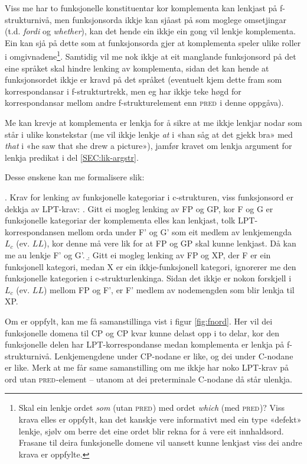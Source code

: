 \documentclass[12pt,a4paper,oneside,draft]{report}
\newcommand{\F}[2]{\textsc{#1}\ensuremath{_{#2}}}
\newcommand{\PRED}{\F{pred}{}}
\begin{document}
Viss me har to funksjonelle konstituentar kor komplementa kan lenkjast
 på f\hyp{}strukturnivå, men funksjonsorda ikkje kan sjåast på som
 moglege omsetjingar (t.d. \emph{fordi} og \emph{whether}), kan det hende ein
 ikkje ein gong vil lenkje komplementa. Ein kan sjå på dette som at
 funksjonsorda gjer at komplementa speler ulike roller i
 omgivnadene\footnote{Skal ein lenkje ordet \emph{som} (utan \PRED{}) med ordet \emph{which} (med
        \PRED{})? Viss krava elles er oppfylt, kan det kanskje vere
        informativt med ein type «defekt» lenkje, sjølv om berre det
        eine ordet blir rekna for å vere eit innhaldsord. Frasane til
        deira funksjonelle domene vil uansett kunne lenkjast viss dei andre
        krava er oppfylte. }. Samtidig vil me nok ikkje at eit manglande
 funksjonsord på det eine språket skal hindre lenking av komplementa,
 sidan det kan hende at funksjonsordet ikkje er kravd på det språket
 (eventuelt kjem dette fram som korrespondansar i
 f\hyp{}strukturtrekk, men eg har ikkje teke høgd for korrespondansar
 mellom andre f\hyp{}strukturelement enn \PRED{} i denne oppgåva).

Me kan krevje at komplementa er lenkja for å sikre at me ikkje lenkjar
 nodar som står i ulike konstekstar (me vil ikkje lenkje \emph{at} i «han
 såg at det gjekk bra» med \emph{that} i «he saw that she drew a picture»),
 jamfør kravet om lenkja argument for lenkja predikat i del
 \ref{SEC:lik-argstr}.

Desse ønskene kan me formalisere slik:

\ex. \label{fnordkrav} Krav for lenking av funksjonelle kategoriar i
    c\hyp{}strukturen, viss funksjonsord er dekkja av LPT-krav:
\a. Gitt ei mogleg lenking av FP og GP, kor F og G er funksjonelle
    kategoriar der komplementa elles kan lenkjast,
    tolk LPT\hyp{}korrespondansen mellom orda under F' og G' som eit
    medlem av lenkjemengda $L_c$ (ev. $LL$), kor denne må vere lik
    for at FP og GP skal kunne lenkjast. Då kan me au lenkje F' og G'.
\b. Gitt ei mogleg lenking av FP og XP, der F er ein funksjonell
    kategori, medan X er ein ikkje-funksjonell kategori, ignorerer me
    den funksjonelle kategorien i c\hyp{}strukturlenkinga. Sidan det ikkje
    er nokon forskjell i $L_c$ (ev. $LL$) mellom FP og F', er F' medlem
    av nodemengden som blir lenkja til XP.

Om \Last[a] er oppfylt, kan me få samanstillinga vist i figur
 \ref{fig:fnord}. Her vil dei funksjonelle domena til CP og CP kvar
 kunne delast opp i to delar, kor den funksjonelle delen har
 LPT\hyp{}korrespondanse medan komplementa er lenkja på
 f\hyp{}strukturnivå. Lenkjemengdene under CP-nodane er like, og dei under
 C-nodane er like. Merk at me får same samanstilling om me ikkje har
 noko LPT-krav på ord utan \PRED{}-element -- utanom at dei
 preterminale C-nodane då står ulenkja.
\end{document}
